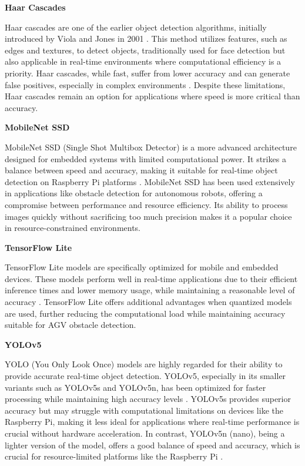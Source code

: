 \textbf{Haar Cascades}

Haar cascades are one of the earlier object detection algorithms, initially introduced by Viola and Jones in 2001 \cite{viola2001robust}. This method utilizes features, such as edges and textures, to detect objects, traditionally used for face detection but also applicable in real-time environments where computational efficiency is a priority. Haar cascades, while fast, suffer from lower accuracy and can generate false positives, especially in complex environments \cite{machinelearningmastery2024}. Despite these limitations, Haar cascades remain an option for applications where speed is more critical than accuracy.

\textbf{MobileNet SSD}

MobileNet SSD (Single Shot Multibox Detector) is a more advanced architecture designed for embedded systems with limited computational power. It strikes a balance between speed and accuracy, making it suitable for real-time object detection on Raspberry Pi platforms \cite{howtotrainyourrobot2023}. MobileNet SSD has been used extensively in applications like obstacle detection for autonomous robots, offering a compromise between performance and resource efficiency. Its ability to process images quickly without sacrificing too much precision makes it a popular choice in resource-constrained environments.

\textbf{TensorFlow Lite}

TensorFlow Lite models are specifically optimized for mobile and embedded devices. These models perform well in real-time applications due to their efficient inference times and lower memory usage, while maintaining a reasonable level of accuracy \cite{tensorflowlite}. TensorFlow Lite offers additional advantages when quantized models are used, further reducing the computational load while maintaining accuracy suitable for AGV obstacle detection.

\textbf{YOLOv5}

YOLO (You Only Look Once) models are highly regarded for their ability to provide accurate real-time object detection. YOLOv5, especially in its smaller variants such as YOLOv5s and YOLOv5n, has been optimized for faster processing while maintaining high accuracy levels \cite{yolov5github}. YOLOv5s provides superior accuracy but may struggle with computational limitations on devices like the Raspberry Pi, making it less ideal for applications where real-time performance is crucial without hardware acceleration. In contrast, YOLOv5n (nano), being a lighter version of the model, offers a good balance of speed and accuracy, which is crucial for resource-limited platforms like the Raspberry Pi \cite{MuhammadYolo}.

